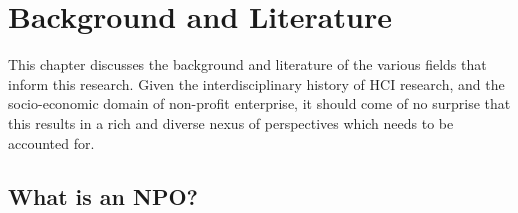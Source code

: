 \chapter{Background and Literature}
\label{sec:related}

This chapter discusses the background and literature of the various fields that inform this research. Given the interdisciplinary history of HCI research, and the socio-economic domain of non-profit enterprise, it should come of no surprise that this results in a rich and diverse nexus of perspectives which needs to be accounted for.

\section{What is an NPO?}



